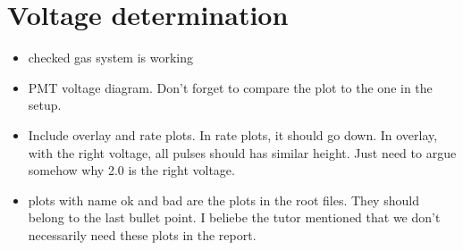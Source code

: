 \clearpage
\section{Voltage determination}\label{sec:vol}

\begin{itemize}
	\item  checked gas system is working

	\item PMT voltage diagram. Don't forget to compare the plot to the one in the setup.

	\item Include overlay and rate plots. In rate plots, it should go down. In overlay, with the right voltage, all pulses should has similar height. Just need to argue somehow why 2.0 is the right voltage.
	\item plots with name ok and bad are the plots in the root files. They should belong to the last bullet point. I beliebe the tutor mentioned that we don't necessarily need these plots in the report.
\end{itemize}
